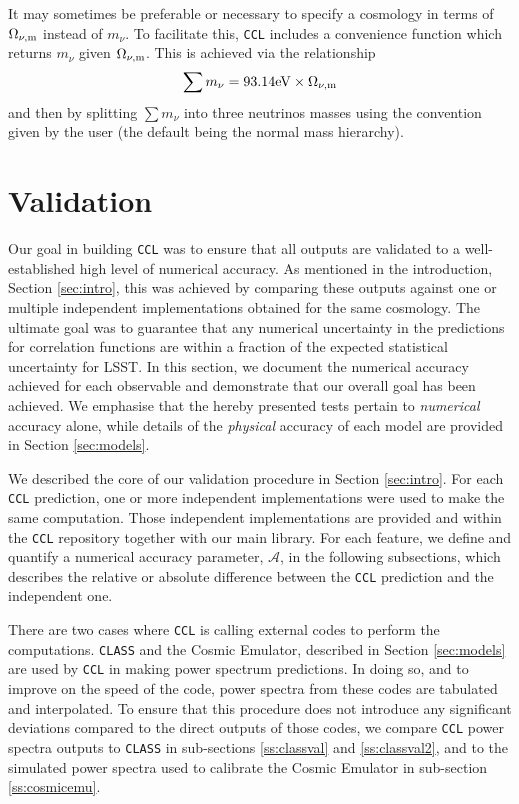 \documentclass[\docopts]{\docclass}
\newcommand{\ccl}{{\tt CCL}\xspace}
\begin{document}
It may sometimes be preferable or necessary to specify a cosmology in terms of $\Omega_{\nu, {\rm m}}$ instead of $m_\nu$. To facilitate this, \ccl includes a convenience function which returns $m_\nu$ given $\Omega_{\nu, {\rm m}}$. This is achieved via the relationship
\begin{equation}
\sum m_\nu = 93.14 {\rm eV} \times \Omega_{\nu, {\rm m}}
\label{summnu_om}
\end{equation}
and then by splitting $\sum m_\nu$ into three neutrinos masses using the convention given by the user (the default being the normal mass hierarchy).


\section{Validation}
\label{sec:validation}

Our goal in building \ccl was to ensure that all outputs are validated to a well-established high level of numerical accuracy. As mentioned in the introduction, Section \ref{sec:intro}, this was achieved by comparing these outputs against one or multiple independent implementations obtained for the same cosmology. The ultimate goal was to guarantee that any numerical uncertainty in the predictions for correlation functions are within a fraction of the expected statistical uncertainty for LSST. In this section, we document the numerical accuracy achieved for each observable and demonstrate that our overall goal has been achieved. We emphasise that the hereby presented tests pertain to {\it numerical} accuracy alone, while details of the {\it physical} accuracy of each model are provided in Section \ref{sec:models}. 

We described the core of our validation procedure in Section \ref{sec:intro}. For each \ccl prediction, one or more independent implementations were used to make the same computation. Those independent implementations are provided and within the \ccl repository together with our main library. For each feature, we define and quantify a numerical accuracy parameter, $\mathcal{A}$, in the following subsections, which describes the relative or absolute difference between the \ccl prediction and the independent one. 

There are two cases where \ccl is calling external codes to perform the computations. {\tt CLASS} and the Cosmic Emulator, described in Section \ref{sec:models} are used by \ccl in making power spectrum predictions. In doing so, and to improve on the speed of the code, power spectra from these codes are tabulated and interpolated. To ensure that this procedure does not introduce any significant deviations compared to the direct outputs of those codes, we compare \ccl power spectra outputs to {\tt CLASS} in sub-sections \ref{ss:classval} and  \ref{ss:classval2}, and to the simulated power spectra used to calibrate the Cosmic Emulator in sub-section \ref{ss:cosmicemu}.
\end{document}
